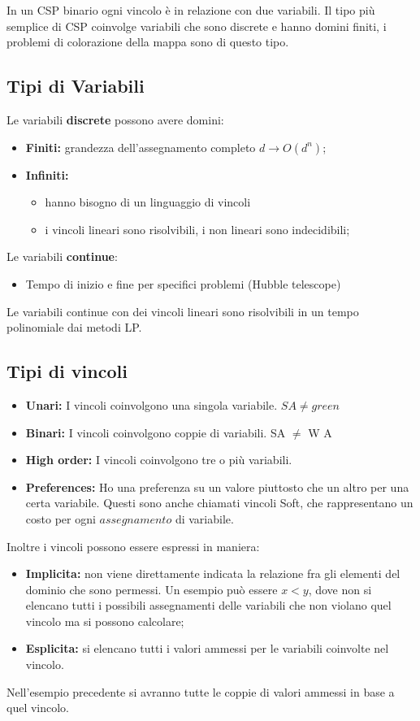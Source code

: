 \noindent In un CSP binario ogni vincolo è in relazione con due variabili. Il
tipo più semplice di CSP coinvolge variabili che sono discrete e hanno domini
finiti, i problemi di colorazione della mappa sono di questo tipo.

\subsection{Tipi di Variabili}
Le variabili \textbf{discrete} possono avere domini:
\begin{itemize}
    \item \textbf{Finiti:} grandezza dell'assegnamento completo $d \rightarrow
              O(d^n)$;
    \item \textbf{Infiniti:}
          \begin{itemize}
              \item hanno bisogno di un linguaggio di vincoli
              \item i vincoli lineari sono risolvibili, i non lineari sono
                    indecidibili;
          \end{itemize}
\end{itemize}
Le variabili \textbf{continue}:
\begin{itemize}
    \item Tempo di inizio e fine per specifici problemi (Hubble telescope)
\end{itemize}
Le variabili continue con dei vincoli lineari sono risolvibili in un tempo
polinomiale dai metodi LP.

\subsection{Tipi di vincoli}
\begin{itemize}
    \item \textbf{Unari:} I vincoli coinvolgono una singola variabile. $SA \neq
              green$
    \item \textbf{Binari:} I vincoli coinvolgono coppie di variabili. SA $\neq$
          W A
    \item \textbf{High order:} I vincoli coinvolgono tre o più variabili.
    \item \textbf{Preferences:} Ho una preferenza su un valore piuttosto che un
          altro per una certa variabile. Questi sono anche chiamati vincoli Soft, che
          rappresentano un costo per ogni $assegnamento$ di variabile.
\end{itemize}
Inoltre i vincoli possono essere espressi in maniera:
\begin{itemize}
    \item \textbf{Implicita:} non viene direttamente indicata la relazione fra
          gli elementi del dominio che sono permessi. Un esempio può essere $x<y$, dove
          non si elencano tutti i possibili assegnamenti delle variabili che non
          violano quel vincolo ma si possono calcolare;
    \item \textbf{Esplicita:} si elencano tutti i valori ammessi per le
          variabili coinvolte nel vincolo.
\end{itemize}
Nell'esempio precedente si avranno tutte le coppie di valori ammessi in base a
quel vincolo.

